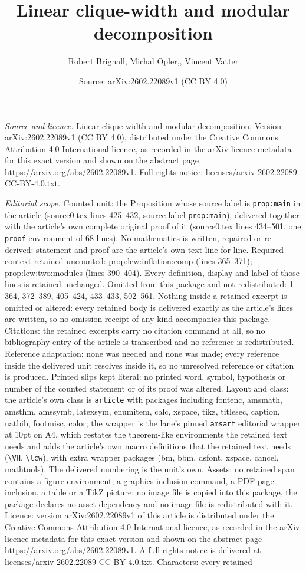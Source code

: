 \documentclass[10pt,a4paper]{amsart}
\title[Linear clique-width and modular decomposition]{Linear clique-width and modular decomposition}
\author{Robert Brignall, Michal Opler,, Vincent Vatter}
\date{Source: arXiv:2602.22089v1 (CC BY 4.0)}
\begin{document}
\maketitle

\noindent\emph{Source and licence.} Linear clique-width and modular decomposition. Version arXiv:2602.22089v1 (CC BY 4.0), distributed under the Creative Commons Attribution 4.0 International licence, as recorded in the arXiv licence metadata for this exact version and shown on the abstract page https://arxiv.org/abs/2602.22089v1. Full rights notice: licenses/arxiv-2602.22089-CC-BY-4.0.txt.\par\smallskip

\noindent\textit{Editorial scope.} Counted unit: the Proposition whose source label is \texttt{prop:main} in the article (source0.tex lines 425--432, source label \texttt{prop:main}), delivered together with the article's own complete original proof of it (source0.tex lines 434--501, one \texttt{proof} environment of 68 lines). No mathematics is written, repaired or re-derived: statement and proof are the article's own text line for line. Required context retained uncounted: prop:lcw:inflation:comp (lines 365--371); prop:lcw:two:modules (lines 390--404). Every definition, display and label of those lines is retained unchanged. Omitted from this package and not redistributed: 1--364, 372--389, 405--424, 433--433, 502--561. Nothing inside a retained excerpt is omitted or altered: every retained body is delivered exactly as the article's lines are written, so no omission receipt of any kind accompanies this package. Citations: the retained excerpts carry no citation command at all, so no bibliography entry of the article is transcribed and no reference is redistributed. Reference adaptation: none was needed and none was made; every reference inside the delivered unit resolves inside it, so no unresolved reference or citation is produced. Printed slips kept literal: no printed word, symbol, hypothesis or number of the counted statement or of its proof was altered. Layout and class: the article's own class is \texttt{article} with packages including fontenc, amsmath, amsthm, amssymb, latexsym, enumitem, calc, xspace, tikz, titlesec, caption, natbib, footmisc, color; the wrapper is the lane's pinned \texttt{amsart} editorial wrapper at 10pt on A4, which restates the theorem-like environments the retained text needs and adds the article's own macro definitions that the retained text needs (\texttt{\textbackslash VH}, \texttt{\textbackslash lcw}), with extra wrapper packages (bm, bbm, dsfont, xspace, cancel, mathtools). The delivered numbering is the unit's own. Assets: no retained span contains a figure environment, a graphics-inclusion command, a PDF-page inclusion, a table or a TikZ picture; no image file is copied into this package, the package declares no asset dependency and no image file is redistributed with it. Licence: version arXiv:2602.22089v1 of this article is distributed under the Creative Commons Attribution 4.0 International licence, as recorded in the arXiv licence metadata for this exact version and shown on the abstract page https://arxiv.org/abs/2602.22089v1. A full rights notice is delivered at licenses/arxiv-2602.22089-CC-BY-4.0.txt. Characters: every retained 
\end{document}
